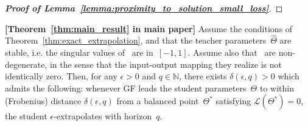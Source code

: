 \begin{proof}[\textbf{Proof of Lemma~\ref{lemma:proximity_to_solution_small_loss}}]





\end{proof}


\begin{theorem}\textbf{[Theorem~\ref{thm:main_result} in main paper]}
\label{thm:approx_extrapolation}
Assume the conditions of Theorem~\ref{thm:exact_extrapolation}, and that the teacher parameters~$\hat{\Theta}$ are stable, i.e. the singular values of~\smash{$\hat{\mA}$} are in~$[-1,1]$.
Assume also that~\smash{$\hat{\Theta}$} are non-degenerate, in the sense that the input-output mapping they realize is not identically zero.
Then, for any $\epsilon > 0$ and $q \in \mathbb{N}$, there exists $\delta(\epsilon, q) > 0$ which admits the following:
whenever GF leads the student parameters~$\Theta$ to within (Frobenius) distance $\delta(\epsilon,q)$ from a balanced point~$\Theta^*$ satisfying $\mathcal{L} ( \Theta^* ) = 0$, the student $\epsilon$-extrapolates with horizon~$q$. 
\end{theorem}

